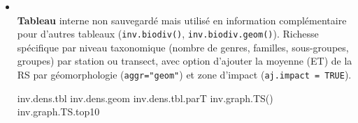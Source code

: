 \documentclass{article}
\begin{document}
\begin{itemize}
  \item[] \\
    \textbf{Tableau} interne non sauvegardé mais utilisé en
    information complémentaire pour d'autres tableaux
    (\texttt{inv.biodiv()}, \texttt{inv.biodiv.geom()}). Richesse
    spécifique par niveau taxonomique (nombre de genres, familles, sous-groupes,
    groupes) par station ou transect, avec option d'ajouter la moyenne
    (ET) de la RS par géomorphologie (\texttt{aggr="geom"}) et zone
    d'impact (\texttt{aj.impact = TRUE}).

    inv.dens.tbl
  inv.dens.geom
  inv.dens.tbl.parT
  inv.graph.TS()
  inv.graph.TS.top10

\end{itemize}
\end{document}
